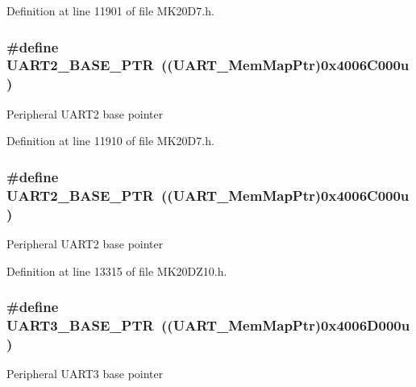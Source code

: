 Definition at line 11901 of file M\+K20\+D7.\+h.

\subsubsection[{\texorpdfstring{U\+A\+R\+T2\+\_\+\+B\+A\+S\+E\+\_\+\+P\+TR}{UART2_BASE_PTR}}]{\setlength{\rightskip}{0pt plus 5cm}\#define U\+A\+R\+T2\+\_\+\+B\+A\+S\+E\+\_\+\+P\+TR~(({\bf U\+A\+R\+T\+\_\+\+Mem\+Map\+Ptr})0x4006\+C000u)}\hypertarget{group___u_a_r_t___peripheral_ga75ca2ea4e490b3c1c7aa55fc9c25cd37}{}\label{group___u_a_r_t___peripheral_ga75ca2ea4e490b3c1c7aa55fc9c25cd37}
Peripheral U\+A\+R\+T2 base pointer 

Definition at line 11910 of file M\+K20\+D7.\+h.

\subsubsection[{\texorpdfstring{U\+A\+R\+T2\+\_\+\+B\+A\+S\+E\+\_\+\+P\+TR}{UART2_BASE_PTR}}]{\setlength{\rightskip}{0pt plus 5cm}\#define U\+A\+R\+T2\+\_\+\+B\+A\+S\+E\+\_\+\+P\+TR~(({\bf U\+A\+R\+T\+\_\+\+Mem\+Map\+Ptr})0x4006\+C000u)}\hypertarget{group___u_a_r_t___peripheral_ga75ca2ea4e490b3c1c7aa55fc9c25cd37}{}\label{group___u_a_r_t___peripheral_ga75ca2ea4e490b3c1c7aa55fc9c25cd37}
Peripheral U\+A\+R\+T2 base pointer 

Definition at line 13315 of file M\+K20\+D\+Z10.\+h.

\subsubsection[{\texorpdfstring{U\+A\+R\+T3\+\_\+\+B\+A\+S\+E\+\_\+\+P\+TR}{UART3_BASE_PTR}}]{\setlength{\rightskip}{0pt plus 5cm}\#define U\+A\+R\+T3\+\_\+\+B\+A\+S\+E\+\_\+\+P\+TR~(({\bf U\+A\+R\+T\+\_\+\+Mem\+Map\+Ptr})0x4006\+D000u)}\hypertarget{group___u_a_r_t___peripheral_gadf42d0466618b9209401839e1af9b3c4}{}\label{group___u_a_r_t___peripheral_gadf42d0466618b9209401839e1af9b3c4}
Peripheral U\+A\+R\+T3 base pointer 


